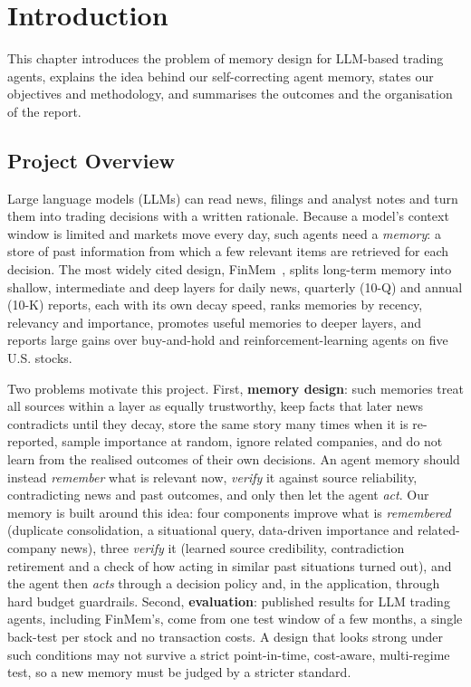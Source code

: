 \chapter{Introduction}
\label{ch:intro}

This chapter introduces the problem of memory design for LLM-based trading agents, explains the idea behind our self-correcting agent memory, states our objectives and methodology, and summarises the outcomes and the organisation of the report.

\section{Project Overview}
Large language models (LLMs) can read news, filings and analyst notes and turn them into trading decisions with a written rationale. Because a model's context window is limited and markets move every day, such agents need a \emph{memory}: a store of past information from which a few relevant items are retrieved for each decision. The most widely cited design, FinMem~\cite{yu2023finmem}, splits long-term memory into shallow, intermediate and deep layers for daily news, quarterly (10-Q) and annual (10-K) reports, each with its own decay speed, ranks memories by recency, relevancy and importance, promotes useful memories to deeper layers, and reports large gains over buy-and-hold and reinforcement-learning agents on five U.S. stocks.

Two problems motivate this project. First, \textbf{memory design}: such memories treat all sources within a layer as equally trustworthy, keep facts that later news contradicts until they decay, store the same story many times when it is re-reported, sample importance at random, ignore related companies, and do not learn from the realised outcomes of their own decisions. An agent memory should instead \emph{remember} what is relevant now, \emph{verify} it against source reliability, contradicting news and past outcomes, and only then let the agent \emph{act}. Our memory is built around this idea: four components improve what is \emph{remembered} (duplicate consolidation, a situational query, data-driven importance and related-company news), three \emph{verify} it (learned source credibility, contradiction retirement and a check of how acting in similar past situations turned out), and the agent then \emph{acts} through a decision policy and, in the application, through hard budget guardrails. Second, \textbf{evaluation}: published results for LLM trading agents, including FinMem's, come from one test window of a few months, a single back-test per stock and no transaction costs. A design that looks strong under such conditions may not survive a strict point-in-time, cost-aware, multi-regime test, so a new memory must be judged by a stricter standard.

